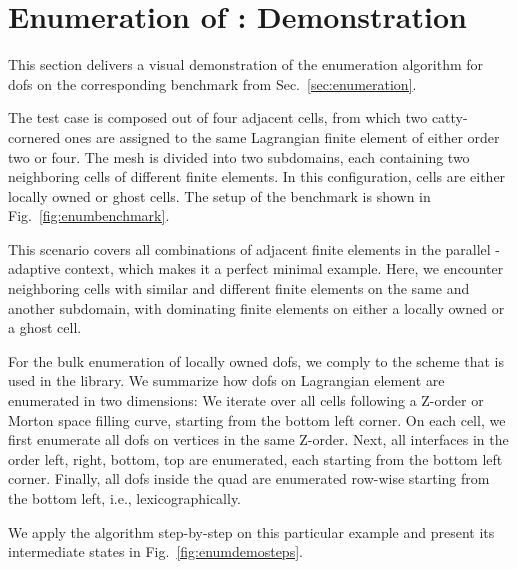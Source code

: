 \chapter{Enumeration of : Demonstration}
\label{app::enumeration}

This section delivers a visual demonstration of the enumeration algorithm for \glspl{dof} on the corresponding benchmark from Sec.~\ref{sec:enumeration}.

The test case is composed out of four adjacent cells, from which two catty-cornered ones are assigned to the same Lagrangian finite element of either order two or four. The mesh is divided into two subdomains, each containing two neighboring cells of different finite elements. In this configuration, cells are either locally owned or ghost cells. The setup of the benchmark is shown in Fig.~\ref{fig:enumbenchmark}. %

This scenario covers all combinations of adjacent finite elements in the parallel \hp-adaptive context, which makes it a perfect minimal example. Here, we encounter neighboring cells with similar and different finite elements on the same and another subdomain, with dominating finite elements on either a locally owned or a ghost cell.

For the bulk enumeration of locally owned \glspl{dof}, we comply to the scheme that is used in the \dealii{} library. We summarize how \glspl{dof} on Lagrangian element \textcite{dealiifeq} are enumerated in two dimensions: We iterate over all cells following a Z-order or Morton space filling curve, starting from the bottom left corner. On each cell, we first enumerate all \glspl{dof} on vertices in the same Z-order. Next, all interfaces in the order left, right, bottom, top are enumerated, each starting from the bottom left corner. Finally, all \glspl{dof} inside the quad are enumerated row-wise starting from the bottom left, i.e., lexicographically.

We apply the algorithm step-by-step on this particular example and present its intermediate states in Fig.~\ref{fig:enumdemosteps}.

